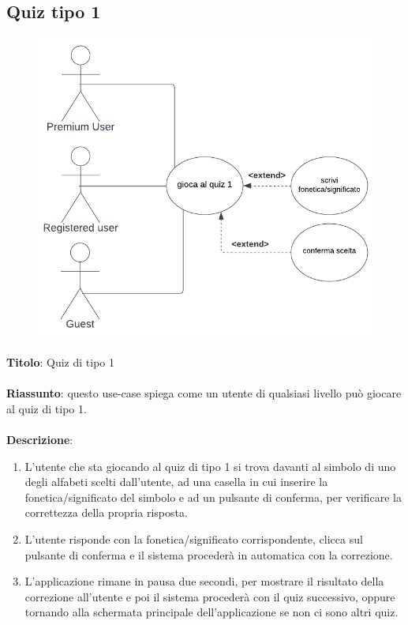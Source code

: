 \subsection{Quiz tipo 1} \label{req_quiz_1}
\begin{figure}[!h]
\centering
\includegraphics[scale=0.35]{images/use_case_quiz_1.png}
\end{figure}
\noindent
\textbf{Titolo}: Quiz di tipo 1\\
\\
\textbf{Riassunto}: questo use-case spiega come un utente di qualsiasi livello può giocare al quiz di tipo 1.\\
\\
\textbf{Descrizione}:
\begin{enumerate}
    \item L'utente che sta giocando al quiz di tipo 1 si trova davanti al simbolo di uno degli alfabeti scelti dall'utente, ad una casella in cui inserire la fonetica/significato del simbolo e ad un pulsante di conferma, per verificare la correttezza della propria risposta.
    \item L'utente risponde con la fonetica/significato corrispondente, clicca sul pulsante di conferma e il sistema procederà in automatica con la correzione.
    \item L'applicazione rimane in pausa due secondi, per mostrare il risultato della correzione all'utente e poi il sistema procederà con il quiz successivo, oppure tornando alla schermata principale dell'applicazione se non ci sono altri quiz.
\end{enumerate}


